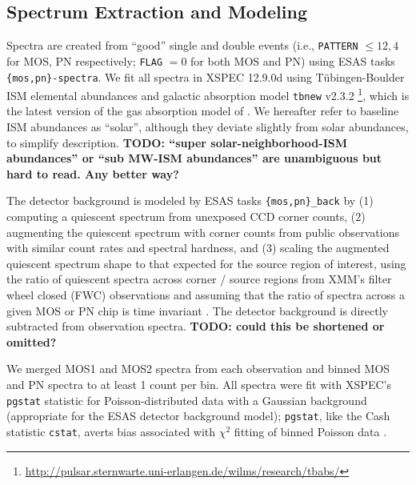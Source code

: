 \documentclass[preprint2,tighten,trackchanges]{aastex6}
\begin{document}
\begin{figure*}[!ht]
    \label{fig:regions}
\end{figure*}

\subsection{Spectrum Extraction and Modeling}

Spectra are created from ``good'' single and double events (i.e.,
\texttt{PATTERN} $\leq 12,4$ for MOS, PN respectively; \texttt{FLAG} $= 0$ for
both MOS and PN) using ESAS tasks \texttt{\{mos,pn\}-spectra}.
We fit all spectra in XSPEC 12.9.0d \citep{arnaud1996}
using T{\"u}bingen-Boulder ISM elemental abundances \citep{wilms2000}
and galactic absorption model \texttt{tbnew} v2.3.2
\footnote{\url{http://pulsar.sternwarte.uni-erlangen.de/wilms/research/tbabs/}},
which is the latest version of the gas absorption model of \citet{wilms2000}.
We hereafter refer to baseline ISM abundances as ``solar'', although they
deviate slightly from solar abundances, to simplify description.
\textbf{TODO: ``super solar-neighborhood-ISM abundances'' or
``sub MW-ISM abundances'' are unambiguous but hard to read.  Any better way?}

The detector background is modeled by ESAS tasks \texttt{\{mos,pn\}\_back}
by (1) computing a quiescent spectrum from unexposed CCD corner counts,
(2) augmenting the quiescent spectrum with corner counts from public
observations with similar count rates and spectral hardness, and (3) scaling
the augmented quiescent spectrum shape to that expected for the source region
of interest, using the ratio of quiescent spectra across corner / source
regions from XMM's filter wheel closed (FWC) observations and assuming that the
ratio of spectra across a given MOS or PN chip is time invariant
\citep[Sec. 3.4]{kuntz2008}.
The detector background is directly subtracted from observation spectra.
\textbf{TODO: could this be shortened or omitted?}  %

We merged MOS1 and MOS2 spectra from each observation and binned MOS and PN
spectra to at least 1 count per bin.
All spectra were fit with XSPEC's \texttt{pgstat} statistic for
Poisson-distributed data with a Gaussian background (appropriate for the ESAS
detector background model); \texttt{pgstat}, like the Cash statistic
\texttt{cstat}, averts bias associated with $\chi^2$ fitting of binned Poisson
data \citep{humphrey2009}.
\end{document}
